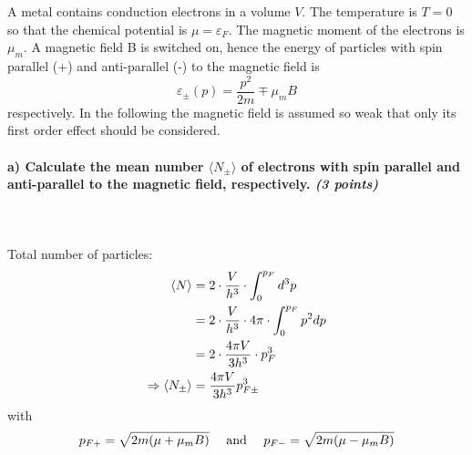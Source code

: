 A metal contains conduction electrons in a volume $V$. 
The temperature is $T=0$ so that the chemical potential is 
$\mu=\varepsilon_F$. The magnetic moment of the electrons 
is $\mu_m$. A magnetic field B is switched on, hence the 
energy of particles with spin parallel (+) and anti-parallel 
(-) to the magnetic field is
\begin{equation}
    \varepsilon_\pm(p)=\frac{p^2}{2m}\mp\mu_mB
\end{equation}
respectively. In the following the magnetic field is assumed 
so weak that only its first order effect should be considered.

\paragraph{a) Calculate the mean number $\langle N_\pm\rangle$ 
    of electrons with spin parallel and anti-parallel to the 
    magnetic field, respectively. \textit{(3 points)}
} \ \\
    \\
    Total number of particles:
    \begin{align}
        \langle N\rangle
        &=2\cdot\frac{V}{h^3}\cdot\int_0^{p_F}d^3p \\
        &=2\cdot\frac{V}{h^3}\cdot4\pi\cdot\int_0^{p_F}p^2dp \\
        &=2\cdot\frac{4\pi V}{3h^3}\cdot p_F^3 \\
        \Rightarrow \langle N_\pm \rangle
        &=\frac{4\pi V}{3h^3}p^3_{F\pm}
    \end{align}
    with
    \begin{align}
        p_{F+}=\sqrt{
            2m(\mu+\mu_mB)
        }
        \ \ \ \ \textnormal{and}\ \ \ \
        p_{F-}=\sqrt{
            2m(\mu-\mu_mB)
        }
    \end{align}


